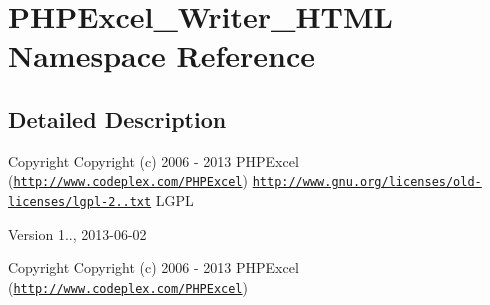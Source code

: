 \hypertarget{namespacePHPExcel__Writer__HTML}{}\section{P\+H\+P\+Excel\+\_\+\+Writer\+\_\+\+H\+T\+ML Namespace Reference}
\label{namespacePHPExcel__Writer__HTML}


\subsection{Detailed Description}
\begin{DoxyCopyright}{Copyright}
Copyright (c) 2006 -\/ 2013 P\+H\+P\+Excel (\href{http://www.codeplex.com/PHPExcel}{\tt http\+://www.\+codeplex.\+com/\+P\+H\+P\+Excel})  \href{http://www.gnu.org/licenses/old-licenses/lgpl-2.1.txt}{\tt http\+://www.\+gnu.\+org/licenses/old-\/licenses/lgpl-\/2..\+txt} L\+G\+PL 
\end{DoxyCopyright}
\begin{DoxyVersion}{Version}
1.., 2013-\/06-\/02
\end{DoxyVersion}
\begin{DoxyCopyright}{Copyright}
Copyright (c) 2006 -\/ 2013 P\+H\+P\+Excel (\href{http://www.codeplex.com/PHPExcel}{\tt http\+://www.\+codeplex.\+com/\+P\+H\+P\+Excel}) 
\end{DoxyCopyright}
